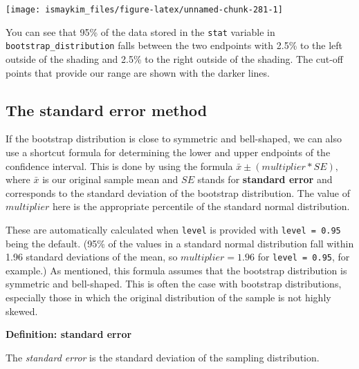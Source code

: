 \documentclass[12pt, krantz2,]{krantz}
\makeatletter
\newenvironment{Shaded}{\begin{snugshade}}{\end{snugshade}}
\newcommand{\DataTypeTok}[1]{\textcolor[rgb]{0.27,0.27,0.27}{#1}}
\newcommand{\KeywordTok}[1]{\textcolor[rgb]{0.27,0.27,0.27}{\textbf{#1}}}
\newcommand{\NormalTok}[1]{#1}
\newcommand{\OperatorTok}[1]{\textcolor[rgb]{0.43,0.43,0.43}{\textbf{#1}}}
\newcommand{\StringTok}[1]{\textcolor[rgb]{0.5,0.5,0.5}{#1}}
\newenvironment{kframe}{%
\medskip{}
\setlength{\fboxsep}{.8em}
 \def\at@end@of@kframe{}%
 \ifinner\ifhmode%
  \def\at@end@of@kframe{\end{minipage}}%
  \begin{minipage}{\columnwidth}%
 \fi\fi%
 \def\FrameCommand##1{\hskip\@totalleftmargin \hskip-\fboxsep
 \colorbox{shadecolor}{##1}\hskip-\fboxsep
     \hskip-\linewidth \hskip-\@totalleftmargin \hskip\columnwidth}%
 \MakeFramed {\advance\hsize-\width
   \@totalleftmargin\z@ \linewidth\hsize
   \@setminipage}}%
 {\par\unskip\endMakeFramed%
 \at@end@of@kframe}
\renewenvironment{Shaded}{\begin{kframe}}{\end{kframe}}
\makeatother
\begin{document}
\begin{Shaded}
\end{Shaded}

\begin{center}\texttt{[image: ismaykim\_files/figure-latex/unnamed-chunk-281-1]} \end{center}

You can see that 95\% of the data stored in the \texttt{stat} variable in \texttt{bootstrap\_distribution} falls between the two endpoints with 2.5\% to the left outside of the shading and 2.5\% to the right outside of the shading. The cut-off points that provide our range are shown with the darker lines.

\hypertarget{the-standard-error-method}{%
\subsection{The standard error method}\label{the-standard-error-method}}

If the bootstrap distribution is close to symmetric and bell-shaped, we can also use a shortcut formula for determining the lower and upper endpoints of the confidence interval. This is done by using the formula \(\bar{x} \pm (multiplier * SE),\) where \(\bar{x}\) is our original sample mean and \(SE\) stands for \textbf{standard error} and corresponds to the standard deviation of the bootstrap distribution. The value of \(multiplier\) here is the appropriate percentile of the standard normal distribution.

These are automatically calculated when \texttt{level} is provided with \texttt{level\ =\ 0.95} being the default. (95\% of the values in a standard normal distribution fall within 1.96 standard deviations of the mean, so \(multiplier = 1.96\) for \texttt{level\ =\ 0.95}, for example.) As mentioned, this formula assumes that the bootstrap distribution is symmetric and bell-shaped. This is often the case with bootstrap distributions, especially those in which the original distribution of the sample is not highly skewed.

\textbf{Definition: standard error}

The \emph{standard error} is the standard deviation of the sampling distribution.
\end{document}
